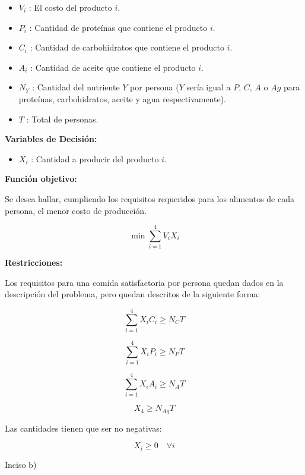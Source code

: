 \documentclass[a4paper,10pt,twocolumn]{article}
\theoremstyle{theorem}
\theoremstyle{definition}
\theoremstyle{remark}
\begin{document}
\begin{itemize}

\item $V_{i}$ : El costo del producto $i$.

\item $P_{i}$ : Cantidad de proteínas que contiene el producto $i$.

\item $C_{i}$ : Cantidad de carbohidratos que contiene el producto $i$.

\item $A_{i}$ : Cantidad de aceite que contiene el producto $i$.

\item $N_{Y}$ : Cantidad del nutriente $Y$ por persona ($Y$ sería igual a $P$, $C$, $A$ o $Ag$ para proteínas, carbohidratos, aceite y agua respectivamente).

\item $T$ : Total de personas.

\end{itemize}

\textbf{Variables de Decisión:}

\begin{itemize}

\item $X_{i}$ : Cantidad a producir del producto $i$.

\end{itemize}

\textbf{Función objetivo:}

Se desea hallar, cumpliendo los requisitos requeridos para los alimentos de cada persona, el menor costo de producción.

$$
\min \sum^{4}_{i=1} V_{i}X_{i}
$$

\textbf{Restricciones:}

Los requisitos para una comida satisfactoria por persona quedan dados en la descripción del problema, pero quedan descritos de la siguiente forma:

$$
\sum^{4}_{i=1} X_{i} C_{i} \geq N_{C} T
$$

$$
\sum^{4}_{i=1} X_{i} P_{i} \geq N_{P} T
$$

$$
\sum^{4}_{i=1} X_{i} A_{i} \geq N_{A} T
$$

$$
X_{4} \geq N_{Ag} T
$$

Las cantidades tienen que ser no negativas:

$$
X_i \ge 0 \quad \forall i
$$

Inciso b)
\end{document}
